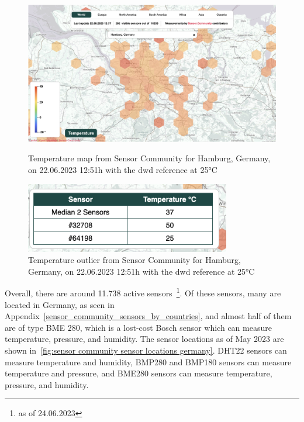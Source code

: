 \begin{figure}[ht]
    \centering
    \includegraphics[width=1\textwidth]{images/sensor_community_temperature_map.png}
    \caption{Temperature map from Sensor Community for Hamburg, Germany, on 22.06.2023 12:51h with the \gls{dwd} reference at 25°C}
    \label{fig:temperature_sensor_community_map}

    \includegraphics[width=0.8\textwidth]{images/sensor_community_outliers.png}
    \caption{Temperature outlier from Sensor Community for Hamburg, Germany, on 22.06.2023 12:51h with the \gls{dwd} reference at 25°C}
    \label{fig:temperature_sensor_community_outlier}
\end{figure}

Overall, there are around 11.738 active sensors~\footnote{as of 24.06.2023}. Of these sensors, many are located in Germany, as seen in Appendix~\ref{sensor_community_sensors_by_countries}, and almost half of them are of type BME 280, which is a lost-cost Bosch sensor which can measure temperature, pressure, and humidity. The sensor locations as of May 2023 are shown in~\ref{fig:sensor community sensor locations germany}. DHT22 sensors can measure temperature and humidity, BMP280 and BMP180 sensors can measure temperature and pressure, and BME280 sensors can measure temperature, pressure, and humidity.\\

